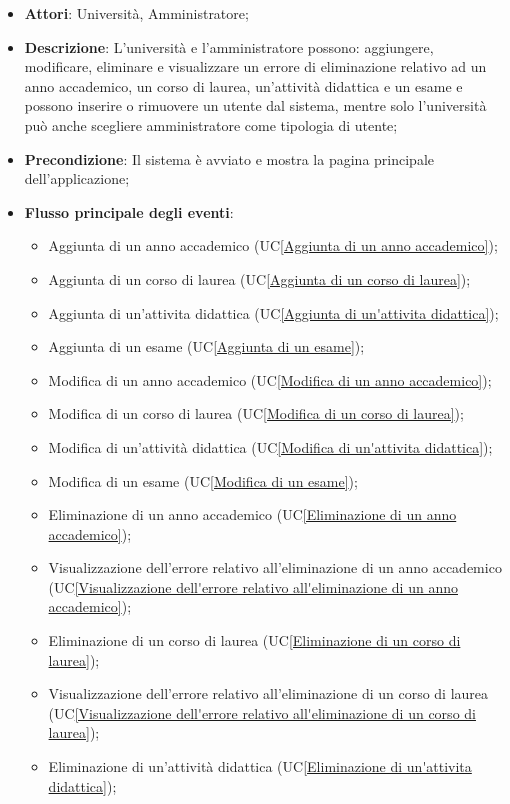 \begin{itemize}
	\item \textbf{Attori}: Università, Amministratore;
	\item \textbf{Descrizione}: L'università e l'amministratore possono: aggiungere, modificare, eliminare e visualizzare un errore di eliminazione relativo ad un anno accademico, un corso di laurea, un'attività didattica e un esame e possono inserire o rimuovere un utente dal sistema, mentre solo l'università può anche scegliere amministratore come tipologia di utente;
	\item \textbf{Precondizione}: Il sistema è avviato e mostra la pagina principale dell'applicazione;
	\item \textbf{Flusso principale degli eventi}: 
	\begin{itemize}
		\item Aggiunta di un anno accademico (UC\ref{Aggiunta di un anno accademico});
		\item Aggiunta di un corso di laurea (UC\ref{Aggiunta di un corso di laurea});
		\item Aggiunta di un'attivita didattica
		(UC\ref{Aggiunta di un'attivita didattica});
		\item Aggiunta di un esame
		(UC\ref{Aggiunta di un esame});
		\item Modifica di un anno accademico
		(UC\ref{Modifica di un anno accademico});
		\item Modifica di un corso di laurea
		(UC\ref{Modifica di un corso di laurea});
		\item Modifica di un'attività didattica
		(UC\ref{Modifica di un'attivita didattica});
		\item Modifica di un esame
		(UC\ref{Modifica di un esame});
		\item Eliminazione di un anno accademico
		(UC\ref{Eliminazione di un anno accademico});
		\item Visualizzazione dell’errore relativo all’eliminazione di un anno accademico 
		(UC\ref{Visualizzazione dell'errore relativo all'eliminazione di un anno accademico});
		\item Eliminazione di un corso di laurea
		(UC\ref{Eliminazione di un corso di laurea});
		\item Visualizzazione dell’errore relativo all’eliminazione di un corso di laurea
		(UC\ref{Visualizzazione dell'errore relativo all'eliminazione di un corso di laurea});
		\item Eliminazione di un'attività didattica
		(UC\ref{Eliminazione di un'attivita didattica});

\end{itemize}
\end{itemize}
